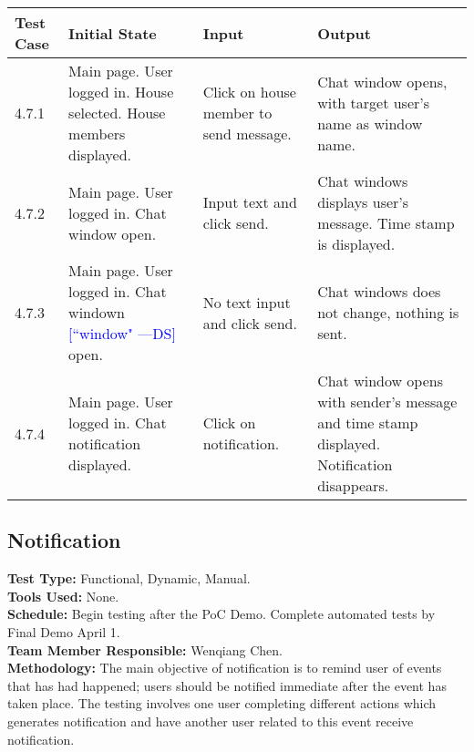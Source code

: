 \documentclass[12pt]{article}
\newcommand{\authornote}[3]{\textcolor{#1}{[#3 ---#2]}}
\newcommand{\authornote}[3]{}
\newcommand{\ds}[1]{\authornote{blue}{DS}{#1}}
\begin{document}
\begin{longtable}[l]{|p{2cm}|p{3cm}|p{5cm}|p{5cm}|}
\hline
\textbf{Test Case}  & \textbf{Initial State} & \textbf{Input} & \textbf{Output} \\ \hline
4.7.1 & Main page. User logged in. House selected. House members displayed. & Click on house member to send message. & Chat window opens, with target user's name as window name. \\ 
\hline
4.7.2 & Main page. User logged in. Chat window open. & Input text and click send. & Chat windows displays user's message. Time stamp is displayed. \\ 
\hline
4.7.3 & Main page. User logged in. Chat windown 
\ds{``window"} 
open. & No text input and click send. & Chat windows does not change, nothing is sent. \\ 
\hline
4.7.4 & Main page. User logged in. Chat notification displayed. & Click on notification. & Chat window opens with sender's message and time stamp displayed. Notification disappears. \\
\hline
\end{longtable}

\subsection{Notification}
\textbf{Test Type:} Functional, Dynamic, Manual. \\
\textbf{Tools Used:} None. \\
\textbf{Schedule:} Begin testing after the PoC Demo. Complete automated tests by Final Demo April 1. \\
\textbf{Team Member Responsible:} Wenqiang Chen. \\
\textbf{Methodology:} The main objective of notification is to remind user of events that has had happened; users should be notified immediate after the event has taken place. The testing involves one user completing different actions which generates notification and have another user related to this event receive notification.
\end{document}
